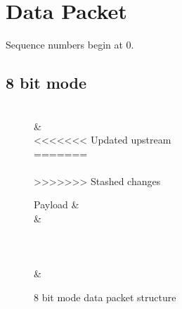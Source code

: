 \documentclass[]{article}
\begin{document}
\section{Data Packet}

Sequence numbers begin at 0.

\subsection{8 bit mode}
\label{8bit}
\begin{figure}[H]
	\centering
	\begin{bytefield}[bitwidth=2em]{16}
		 \\
		 &  \\
<<<<<<< Updated upstream
		  \\
=======
		 \\
		 \\
>>>>>>> Stashed changes
		\begin{rightwordgroup}{Payload}
			 &  \\
			 & \\
			 \\
			 \\
			 \\
			 & 
		\end{rightwordgroup}
	\end{bytefield}
	\caption{8 bit mode data packet structure}
\end{figure}
\end{document}
